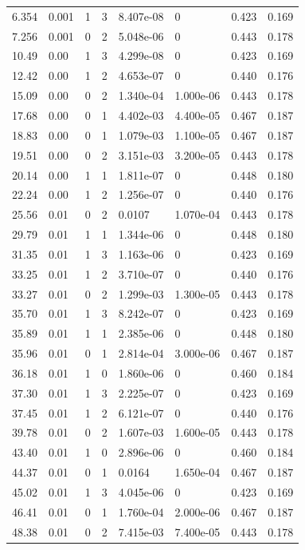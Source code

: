 \documentclass[preview]{standalone}
\begin{document}
{{\begin{tabular}{L{1.2cm}C{1.2cm} C{0.3cm}C{0.5cm} C{1.4cm}C{1.4cm} C{1.4cm}C{1.4cm}}
  6.354  &  0.001  & 1     &  3 &  8.407e-08  & 0  & 0.423 &  0.169   \\ 
  7.256  &  0.001  & 0     &  2 &  5.048e-06  & 0  & 0.443 &  0.178   \\ 
  10.49  &  0.00  & 1     &  3 &  4.299e-08  & 0  & 0.423 &  0.169   \\ 
  12.42  &  0.00  & 1     &  2 &  4.653e-07  & 0  & 0.440 &  0.176   \\ 
  15.09  &  0.00  & 0     &  2 &  1.340e-04  & 1.000e-06  & 0.443 &  0.178   \\ 
  17.68  &  0.00  & 0     &  1 &  4.402e-03  & 4.400e-05  & 0.467 &  0.187   \\ 
  18.83  &  0.00  & 0     &  1 &  1.079e-03  & 1.100e-05  & 0.467 &  0.187   \\ 
  19.51  &  0.00  & 0     &  2 &  3.151e-03  & 3.200e-05  & 0.443 &  0.178   \\ 
  20.14  &  0.00  & 1     &  1 &  1.811e-07  & 0  & 0.448 &  0.180   \\ 
  22.24  &  0.00  & 1     &  2 &  1.256e-07  & 0  & 0.440 &  0.176   \\ 
  25.56  &  0.01  & 0     &  2 &  0.0107  & 1.070e-04  & 0.443 &  0.178   \\ 
  29.79  &  0.01  & 1     &  1 &  1.344e-06  & 0  & 0.448 &  0.180   \\ 
  31.35  &  0.01  & 1     &  3 &  1.163e-06  & 0  & 0.423 &  0.169   \\ 
  33.25  &  0.01  & 1     &  2 &  3.710e-07  & 0  & 0.440 &  0.176   \\ 
  33.27  &  0.01  & 0     &  2 &  1.299e-03  & 1.300e-05  & 0.443 &  0.178   \\ 
  35.70  &  0.01  & 1     &  3 &  8.242e-07  & 0  & 0.423 &  0.169   \\ 
  35.89  &  0.01  & 1     &  1 &  2.385e-06  & 0  & 0.448 &  0.180   \\ 
  35.96  &  0.01  & 0     &  1 &  2.814e-04  & 3.000e-06  & 0.467 &  0.187   \\ 
  36.18  &  0.01  & 1     &  0 &  1.860e-06  & 0  & 0.460 &  0.184   \\ 
  37.30  &  0.01  & 1     &  3 &  2.225e-07  & 0  & 0.423 &  0.169   \\ 
  37.45  &  0.01  & 1     &  2 &  6.121e-07  & 0  & 0.440 &  0.176   \\ 
  39.78  &  0.01  & 0     &  2 &  1.607e-03  & 1.600e-05  & 0.443 &  0.178   \\ 
  43.40  &  0.01  & 1     &  0 &  2.896e-06  & 0  & 0.460 &  0.184   \\ 
  44.37  &  0.01  & 0     &  1 &  0.0164  & 1.650e-04  & 0.467 &  0.187   \\ 
  45.02  &  0.01  & 1     &  3 &  4.045e-06  & 0  & 0.423 &  0.169   \\ 
  46.41  &  0.01  & 0     &  1 &  1.760e-04  & 2.000e-06  & 0.467 &  0.187   \\ 
  48.38  &  0.01  & 0     &  2 &  7.415e-03  & 7.400e-05  & 0.443 &  0.178   \\ 
\hline 
\end{tabular} 

}}
\end{document}
